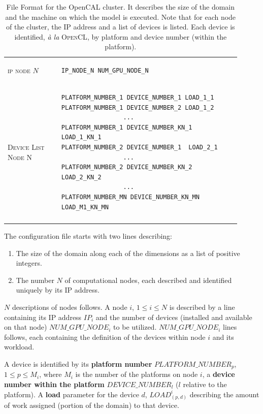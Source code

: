 \begin{table}
\begin{tabular}{m{0.21\linewidth}| m{0.7\linewidth}}
\textsc{ip node $N$}   & 
\begin{verbatim}
IP_NODE_N NUM_GPU_NODE_N
\end{verbatim}
\tabularnewline
\textsc{Device List Node N}  & 
\begin{verbatim}
PLATFORM_NUMBER_1 DEVICE_NUMBER_1 LOAD_1_1
PLATFORM_NUMBER_1 DEVICE_NUMBER_2 LOAD_1_2
                 ...
PLATFORM_NUMBER_1 DEVICE_NUMBER_KN_1 LOAD_1_KN_1
PLATFORM_NUMBER_2 DEVICE_NUMBER_1  LOAD_2_1
                 ...
PLATFORM_NUMBER_2 DEVICE_NUMBER_KN_2 LOAD_2_KN_2
                 ...
PLATFORM_NUMBER_MN DEVICE_NUMBER_KN_MN LOAD_M1_KN_MN
\end{verbatim}
\\ \tabularnewline
\bottomrule
		
\end{tabular}
\caption{File Format for  the OpenCAL cluster. It describes the size of the domain and the machine on which the model is executed. Note that for each node of the cluster, the IP address and a list of devices is listed. Each device is identified, \textit{\`a la} \textsc{OpenCL}, by platform and device number (within the platform).}
\end{table}
\captionsetup[table]{name=Table}

The configuration file starts with two lines describing:
\begin{enumerate}
	\item The size of the domain along each of the dimensions as a list of positive integers.
	\item The number $N$ of computational nodes, each described and identified uniquely by its IP address.
\end{enumerate}
$N$ descriptions of nodes follows.
A node $i$, $1 \leq i \leq N$ is described by a line containing its IP address $IP_i$ and the number of devices (installed and available on that node) $NUM\_GPU\_NODE_i$ to be utilized.
$NUM\_GPU\_NODE_i$ lines follows, each containing the definition of the devices within node $i$ and its workload. 

A device is identified by its \textbf{platform number} $PLATFORM\_NUMBER_p$, $1 \leq p \leq M_i$, where $M_i$ is the number of the platforms on node $i$, a \textbf{device number within the platform} $DEVICE\_NUMBER_l$ ($l$ relative to the platform). A \textbf{load} parameter for the device $d$, $LOAD^i_{(p,d)}$ describing the amount of work assigned (portion of the domain) to that device.

